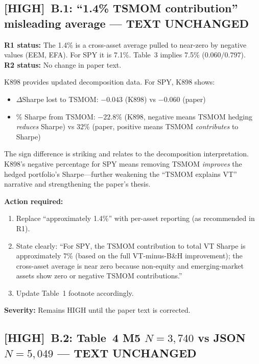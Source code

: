 \documentclass[12pt,a4paper]{article}
\newcommand{\HIGH}{\textcolor{highsev}{\textbf{[HIGH]}}}
\begin{document}
\bigskip


\subsection{\HIGH\ B.1: ``1.4\% TSMOM contribution'' misleading average --- TEXT UNCHANGED}

\textbf{R1 status:} The 1.4\% is a cross-asset average pulled to near-zero by negative values (EEM, EFA). For SPY it is 7.1\%. Table~3 implies 7.5\% ($0.060/0.797$).\\
\textbf{R2 status:} \textcolor{highsev}{No change in paper text.}

K898 provides updated decomposition data. For SPY, K898 shows:
\begin{itemize}[nosep]
\item $\Delta$Sharpe lost to TSMOM: $-0.043$ (K898) vs $-0.060$ (paper)
\item \% Sharpe from TSMOM: $-22.8\%$ (K898, negative means TSMOM hedging \textit{reduces} Sharpe) vs $32\%$ (paper, positive means TSMOM \textit{contributes} to Sharpe)
\end{itemize}

The sign difference is striking and relates to the decomposition interpretation. K898's negative percentage for SPY means removing TSMOM \textit{improves} the hedged portfolio's Sharpe---further weakening the ``TSMOM explains VT'' narrative and strengthening the paper's thesis.

\textbf{Action required:}
\begin{enumerate}[nosep]
\item Replace ``approximately 1.4\%'' with per-asset reporting (as recommended in R1).
\item State clearly: ``For SPY, the TSMOM contribution to total VT Sharpe is approximately 7\% (based on the full VT-minus-B\&H improvement); the cross-asset average is near zero because non-equity and emerging-market assets show zero or negative TSMOM contributions.''
\item Update Table~1 footnote accordingly.
\end{enumerate}

\textbf{Severity:} \textcolor{highsev}{Remains HIGH} until the paper text is corrected.

\bigskip


\subsection{\HIGH\ B.2: Table~4 M5 $N = 3{,}740$ vs JSON $N = 5{,}049$ --- TEXT UNCHANGED}
\end{document}
